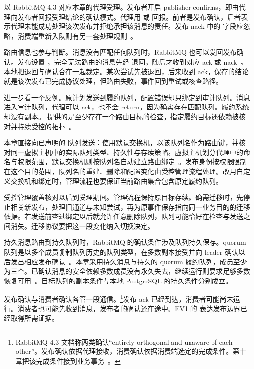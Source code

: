 以 RabbitMQ 4.3 对应本章的代理受理。发布者开启 publisher confirms，即由代理向发布者回报受理结论的确认模式。代理用  或  回报。前者是发布确认，后者表示代理未能成功处理该次发布并拒绝承担该消息的责任。发布 nack 中的  字段应忽略，消费端重新入队则有另一套处理规则~\cite{rabbitmq-confirms}。

路由信息也参与判断。消息没有匹配任何队列时，RabbitMQ 也可以发回发布确认。发布设置 ，完全无法路由的消息先经  退回，随后才收到对应 ack 或 nack~\cite{rabbitmq-confirms}。本地把退回与确认合在一起裁定。某次尝试先被退回，后来收到 ack，保存的结论就是该次发布已完成协议处理，但路由失败，事件回到重试或核查路径。

进一步看一个反例。原计划发送到履约队列，配置错误却只绑定到审计队列。消息进入审计队列，代理可以 ack，也不会 return，因为确实存在匹配队列。履约系统却没有副本。 提供的是至少存在一个路由目标的检查，指定履约目标还依赖被核对并持续受控的拓扑~\cite{rabbitmq-reliability}。

本章直接向已声明的  队列发送：使用默认交换机，以该队列名作为路由键，并核对同一虚拟主机中的实际队列类型、持久性与存续策略。虚拟主机划分代理中的命名与权限范围，默认交换机则按队列名自动建立路由绑定~\cite{rabbitmq-exchanges}。发布身份按权限限制在这个目的范围，队列名的重建、删除和配置变化由受控管理流程处理。改用自定义交换机和绑定时，管理流程也要保证当前路由集合包含原定履约队列。

受控管理覆盖核对以后到受理期间。管理流程保持原目标存续。确需迁移时，先停止相关新发布，处理旧通道与未知尝试，再为原事件保存指向同一业务目的的迁移依据。若发送前查过绑定以后就允许任意删除队列，队列可能恰好在检查与发送之间消失。迁移协议要把这一段变化纳入切换决定。

持久消息路由到持久队列时，RabbitMQ 的确认条件涉及队列持久保存。quorum 队列是以多个成员复制队列历史的队列类型，在多数副本接受并向 leader 确认以后发出相应发布确认~\cite{rabbitmq-confirms}。本章采用持久消息与持久的 quorum 履约队列，成员至少为三个。已确认消息的安全依赖多数成员没有永久失去，继续运行则要求足够多数恢复可用~\cite{rabbitmq-quorum-queues}。目标队列的副本条件与本地 PostgreSQL 的持久条件分别成立。

发布确认与消费者确认各管一段通信。\footnote{RabbitMQ 4.3 文档称两类确认“entirely orthogonal and unaware of each other”。发布确认依据代理接收，消费确认依据消费端选定的完成条件。第十章把该完成条件接到业务事务~\cite{rabbitmq-confirms}。}发布 ack 已经到达，消费者可能尚未运行。消费者也可能先收到消息，发布者的确认还在途中。EV1 的  表达发布边界已经取得所需证据。

